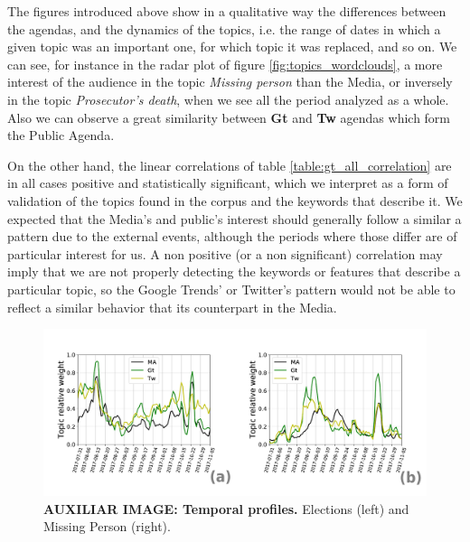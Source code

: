 

\par The figures introduced above show in a qualitative way the differences between the agendas, and the dynamics of the topics, i.e. the range of dates in which a given topic was an important one, for which topic it was replaced, and so on. 
We can see, for instance in the radar plot of figure \ref{fig:topics_wordclouds}, a more interest of the audience in the topic \emph{Missing person} than the Media, or inversely in the topic \emph{Prosecutor's death}, when we see all the period analyzed as a whole. 
Also we can observe a great similarity between \textbf{Gt} and \textbf{Tw} agendas which form the Public Agenda.
\par On the other hand, the linear correlations of table \ref{table:gt_all_correlation} are in all cases positive and statistically significant, which we interpret as a form of validation of the topics found in the corpus and the keywords that describe it. 
We expected that the Media's and public's interest should generally follow a similar a pattern due to the external events, although the periods where those differ are of particular interest for us. 
A non positive (or a non significant) correlation may imply that we are not properly detecting the keywords or features that describe a particular topic, so the Google Trends' or Twitter's pattern would not be able to reflect a similar behavior that its counterpart in the Media.

\begin{figure}[h]
\centering
\includegraphics[width = \textwidth]{images/Fig2_5.pdf}
\caption{\textbf{AUXILIAR IMAGE: Temporal profiles.}
Elections (left) and Missing Person (right).
}
\end{figure}
